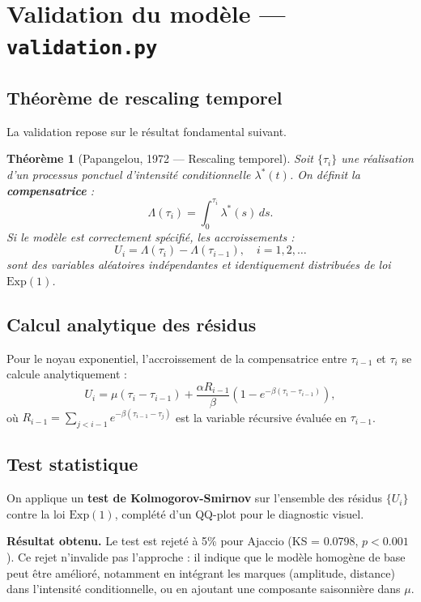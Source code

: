 \documentclass[a4paper,11pt]{article}
\newtheorem{theoreme}{Théorème}[section]
\begin{document}
\section{Validation du modèle --- \texttt{validation.py}}

\subsection{Théorème de rescaling temporel}

La validation repose sur le résultat fondamental suivant.

\begin{theoreme}[Papangelou, 1972 --- Rescaling temporel]
Soit $\{\tau_i\}$ une réalisation d'un processus ponctuel d'intensité conditionnelle $\lambda^*(t)$. On définit la \textbf{compensatrice} :
\[
\Lambda(\tau_i) = \int_0^{\tau_i} \lambda^*(s)\,ds.
\]
Si le modèle est correctement spécifié, les accroissements :
\[
U_i = \Lambda(\tau_i) - \Lambda(\tau_{i-1}), \quad i = 1, 2, \ldots
\]
sont des variables aléatoires indépendantes et identiquement distribuées de loi $\mathrm{Exp}(1)$.
\end{theoreme}

\subsection{Calcul analytique des résidus}

Pour le noyau exponentiel, l'accroissement de la compensatrice entre $\tau_{i-1}$ et $\tau_i$ se calcule analytiquement :
\[
U_i = \mu(\tau_i - \tau_{i-1}) + \frac{\alpha R_{i-1}}{\beta}\left(1 - e^{-\beta(\tau_i - \tau_{i-1})}\right),
\]
où $R_{i-1} = \sum_{j < i-1} e^{-\beta(\tau_{i-1} - \tau_j)}$ est la variable récursive évaluée en $\tau_{i-1}$.

\subsection{Test statistique}

On applique un \textbf{test de Kolmogorov-Smirnov} sur l'ensemble des résidus $\{U_i\}$ contre la loi $\mathrm{Exp}(1)$, complété d'un QQ-plot pour le diagnostic visuel.

\textbf{Résultat obtenu.} Le test est rejeté à 5\% pour Ajaccio (KS = 0.0798, $p < 0.001$). Ce rejet n'invalide pas l'approche : il indique que le modèle homogène de base peut être amélioré, notamment en intégrant les marques (amplitude, distance) dans l'intensité conditionnelle, ou en ajoutant une composante saisonnière dans $\mu$.
\end{document}

